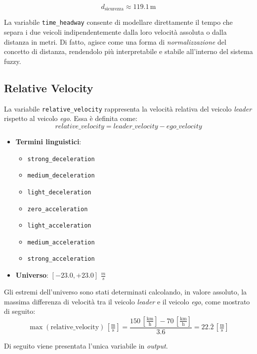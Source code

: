 \[
d_{\mathrm{sicurezza}} \approx 119.1\,\mathrm{m}
\]

\noindent La variabile \texttt{time\_headway} consente di modellare direttamente il tempo che separa i due veicoli 
indipendentemente dalla loro velocità assoluta o dalla distanza in metri. Di fatto, agisce come una forma di 
\emph{normalizzazione} del concetto di distanza, rendendolo più interpretabile e stabile all'interno del sistema fuzzy.

\subsection{Relative Velocity}
La variabile \texttt{relative\_velocity} rappresenta la velocità relativa del veicolo \emph{leader} rispetto al veicolo \emph{ego}.
Essa è definita come:
\[
relative\_velocity = leader\_velocity - ego\_velocity
\]
\begin{itemize}
  \item \textbf{Termini linguistici}:
    \begin{itemize}
      \item \texttt{strong\_deceleration}
      \item \texttt{medium\_deceleration}
      \item \texttt{light\_deceleration}
      \item \texttt{zero\_acceleration}
      \item \texttt{light\_acceleration}
      \item \texttt{medium\_acceleration}
      \item \texttt{strong\_acceleration}
    \end{itemize}
  \item \textbf{Universo}: \([-23.0,+23.0]\) $\frac{m}{s}$
\end{itemize}
Gli estremi dell'universo sono stati determinati calcolando, in valore assoluto, la massima differenza di velocità tra il veicolo
\emph{leader} e il veicolo \emph{ego}, come mostrato di seguito:
\[
  \max(\text{relative\_velocity}) \,\left[\tfrac{\mathrm{m}}{\mathrm{s}}\right]
  = \frac{150\,\left[\tfrac{\mathrm{km}}{\mathrm{h}}\right] - 70\,\left[\tfrac{\mathrm{km}}{\mathrm{h}}\right]}{3.6}
  = 22.\overline{2}\,\left[\tfrac{\mathrm{m}}{\mathrm{s}}\right]
\]

\vspace{10mm}
\noindent Di seguito viene presentata l'unica variabile in \emph{output}.
